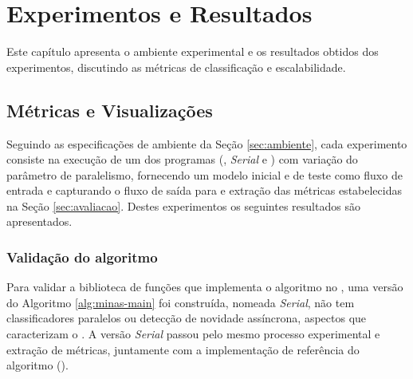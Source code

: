 


% 
% 

\chapter{Experimentos e Resultados}\label{cha:results}

Este capítulo apresenta o ambiente experimental e os resultados obtidos dos
experimentos, discutindo as métricas de classificação e escalabilidade.


% 

\section{Métricas e Visualizações}
\label{sec:experiments}

\newcommand{\serial}{\textit{Serial}\xspace}

Seguindo as especificações de ambiente da Seção \ref{sec:ambiente}, cada
experimento consiste na execução de um dos programas (, \serial e
\mfog) com variação do parâmetro de paralelismo, fornecendo um modelo inicial e
\dataset de teste como fluxo de entrada e capturando o fluxo de saída para e
extração das métricas estabelecidas na Seção \ref{sec:avaliacao}.
Destes experimentos os seguintes resultados são apresentados.

\subsection{Validação do algoritmo}

Para validar a biblioteca de funções que implementa o algoritmo \minas no \mfog,
uma versão do Algoritmo \ref{alg:minas-main} foi construída, nomeada \serial,
não tem classificadores paralelos ou detecção de novidade assíncrona, aspectos
que caracterizam o \mfog.
A versão \serial passou pelo mesmo processo experimental e extração de métricas,
juntamente com a implementação de referência do algoritmo \minas ().

